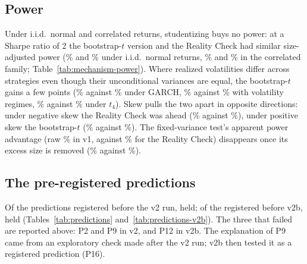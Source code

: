 \subsection{Power}
Under i.i.d.\ normal and correlated returns, studentizing buys no power: at a Sharpe ratio of 2 the bootstrap-$t$ version and the Reality Check had similar size-adjusted power (\% and \% under i.i.d.\ normal returns, \% and \% in the correlated family; Table~\ref{tab:mechanism-power}). Where realized volatilities differ across strategies even though their unconditional variances are equal, the bootstrap-$t$ gains a few points (\% against \% under GARCH, \% against \% with volatility regimes, \% against \% under $t_4$). Skew pulls the two apart in opposite directions: under negative skew the Reality Check was ahead (\% against \%), under positive skew the bootstrap-$t$ (\% against \%). The fixed-variance test's apparent power advantage (raw \% in v1, against \% for the Reality Check) disappears once its excess size is removed (\% against \%).

\subsection{The pre-registered predictions}
Of the  predictions registered before the v2 run,  held; of the  registered before v2b,  held (Tables~\ref{tab:predictions} and~\ref{tab:predictions-v2b}). The three that failed are reported above: P2 and P9 in v2, and P12 in v2b. The explanation of P9 came from an exploratory check made after the v2 run; v2b then tested it as a registered prediction (P16).

